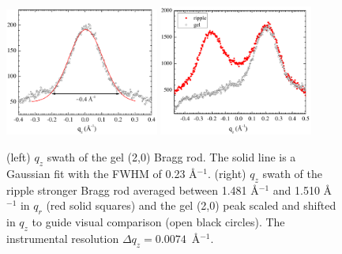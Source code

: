 \begin{figure}[htbp]
  \centering
  \includegraphics[width=0.45\textwidth]{figures/ripple/tWAXS/twaxs_gel_qz}
  \includegraphics[width=0.45\textwidth]{figures/ripple/tWAXS/twaxs_strong_qz}
  \caption[(left) $q_z$ swath of the gel (2,0) Bragg rod]
  {(left) $q_z$ swath of the gel (2,0) Bragg rod. The solid line is
  a Gaussian fit with the FWHM of 0.23 \AA$^{-1}$. 
  (right) $q_z$ swath of the ripple stronger Bragg rod averaged between
  1.481 \AA$^{-1}$ and 1.510 \AA$^{-1}$ in $q_r$
  (red solid squares) and the gel (2,0) peak scaled and shifted in $q_z$ to guide 
  visual comparison (open black circles). 
  The instrumental resolution $\Delta q_z=0.0074$~\AA$^{-1}$.}
  \label{fig:twaxs_gel_qz}
\end{figure}

